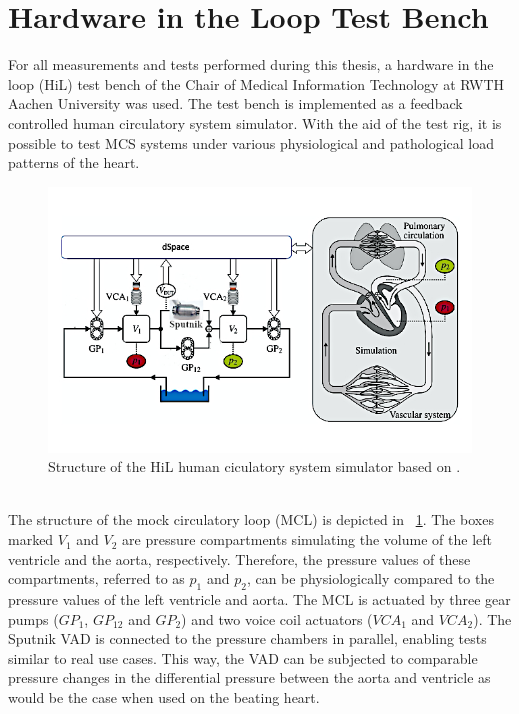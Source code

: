 \section{Hardware in the Loop Test Bench}
For all measurements and tests performed during this thesis, a hardware in the loop (HiL) test bench of the Chair of Medical Information Technology at RWTH Aachen University was used. The test bench is implemented as a feedback controlled human circulatory system simulator. With the aid of the test rig, it is possible to test MCS systems under various physiological and pathological load patterns of the heart.
\begin{figure}[ht]
  \centering
  \includegraphics[width=\textwidth]{images/chapt_4/mock_loop.jpg}
  \caption[HiL test bench]{Structure of the HiL human ciculatory system simulator based on \cite{MCL}.}
  \label{fig:mock_loop}
\end{figure}
\\The structure of the mock circulatory loop (MCL) is depicted in \figurename~\ref{fig:mock_loop}. The boxes marked $V_{1}$ and $V_{2}$ are pressure compartments simulating the volume of the left ventricle and the aorta, respectively. Therefore, the pressure values of these compartments, referred to as $p_{1}$ and $p_{2}$, can be physiologically compared to the pressure values of the left ventricle and aorta. The MCL is actuated by three gear pumps ($GP_{1}$, $GP_{12}$ and $GP_{2}$) and two voice coil actuators ($VCA_{1}$ and $VCA_{2}$). The Sputnik VAD is connected to the pressure chambers in parallel, enabling tests similar to real use cases. This way, the VAD can be subjected to comparable pressure changes in the differential pressure between the aorta and ventricle as would be the case when used on the beating heart.
